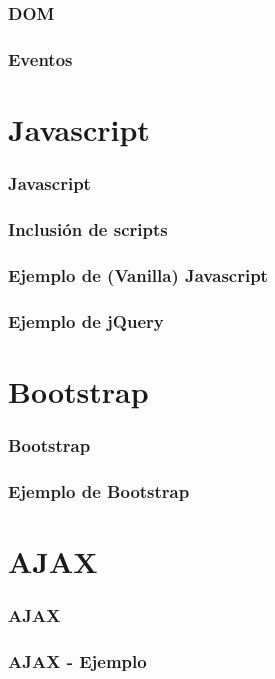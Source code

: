 \documentclass[a4paper,slidestop,xcolor=pst,blue]{beamer}
\begin{document}
\begin{frame}[c]
    \frametitle{DOM}
\end{frame}

\begin{frame}[c]
    \frametitle{Eventos}
\end{frame}

\section{Javascript}

\begin{frame}[c]
    \frametitle{Javascript}
\end{frame}

\begin{frame}[c]
    \frametitle{Inclusión de scripts}
\end{frame}

\begin{frame}[c]
    \frametitle{Ejemplo de (Vanilla) Javascript}
\end{frame}

\begin{frame}[c]
    \frametitle{Ejemplo de jQuery}
\end{frame}

\section{Bootstrap}

\begin{frame}[c]
    \frametitle{Bootstrap}
\end{frame}

\begin{frame}[c]
    \frametitle{Ejemplo de Bootstrap}
\end{frame}

\section{AJAX}

\begin{frame}[c]
    \frametitle{AJAX}
\end{frame}

\begin{frame}[c]
    \frametitle{AJAX - Ejemplo}
\end{frame}
\end{document}
